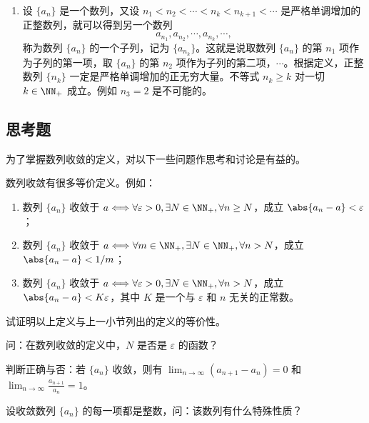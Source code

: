 \begin{enumerate}[label=\arabic*.]
  \item 设 $\{a_n\}$ 是一个数列，又设 $n_1<n_2<\cdots<n_k<n_{k+1}<\cdots$ 是严格单调增加的正整数列，就可以得到另一个数列
  \[
    a_{n_1},a_{n_2},\cdots,a_{n_k},\cdots,
  \]
  称为数列 $\{a_n\}$ 的一个子列，记为 $\{a_{n_k}\}$。这就是说取数列 $\{a_n\}$ 的第 $n_1$ 项作为子列的第一项，取 $\{a_n\}$ 的第 $n_2$ 项作为子列的第二项，$\cdots$。根据定义，正整数列 $\{n_k\}$ 一定是严格单调增加的正无穷大量。不等式 $n_k\ge k$ 对一切 $k\in\NN_+$ 成立。例如 $n_3=2$ 是不可能的。
\end{enumerate}

\subsection{思考题}

为了掌握数列收敛的定义，对以下一些问题作思考和讨论是有益的。

\begin{xthought}[1]
数列收敛有很多等价定义。例如：
  \begin{enumerate}[label=(\arabic*)]
    \item 数列 $\{a_n\}$ 收敛于 $a\Longleftrightarrow\forall\varepsilon>0,\exists N\in\NN_+,\forall n\ge N$，成立 $\abs{a_n-a}<\varepsilon$；
    \item 数列 $\{a_n\}$ 收敛于 $a\Longleftrightarrow\forall m\in\NN_+,\exists N\in\NN_+,\forall n>N$，成立 $\abs{a_n-a}<1/m$；
    \item 数列 $\{a_n\}$ 收敛于 $a\Longleftrightarrow\forall\varepsilon>0,\exists N\in\NN_+,\forall n>N$，成立 $\abs{a_n-a}<K\varepsilon$，其中 $K$ 是一个与 $\varepsilon$ 和 $n$ 无关的正常数。
  \end{enumerate}
  试证明以上定义与上一小节列出的定义的等价性。
\end{xthought}

\begin{xthought}[2]
问：在数列收敛的定义中，$N$ 是否是 $\varepsilon$ 的函数？
\end{xthought}

\begin{xthought}[3]
判断正确与否：若 $\{a_n\}$ 收敛，则有 $\displaystyle\lim_{n\to\infty}(a_{n+1}-a_n)=0$ 和 $\displaystyle\lim_{n\to\infty}\frac{a_{n+1}}{a_n}=1$。
\end{xthought}

\begin{xthought}[4]
设收敛数列 $\{a_n\}$ 的每一项都是整数，问：该数列有什么特殊性质？
\end{xthought}

